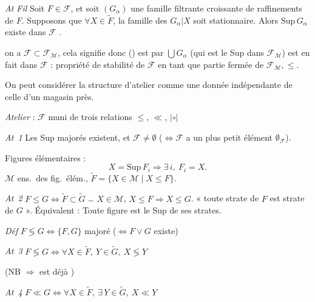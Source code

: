 \documentclass[11pt,a4paper]{article}
\begin{document}
\emph{At Fil}  Soit $F \in \mathcal{F}$, et soit $(G_\alpha)$ une famille filtrante croissante   de raffinements de $F$. Supposons que $\forall X \in \widetilde{F}$, la famille des $G_\alpha | X$ soit stationnaire. Alors $\mathrm{Sup}\, G_\alpha$ existe dans $\mathcal{F}$ \struck{\ill{}}.

 on a $\mathcal{F} \subset \mathcal{F}_{\mathcal{M}}$, cela signifie donc  \ill{} () est par $\bigcup G_\alpha$ (qui est le Sup dans $\mathcal{F}_{\mathcal{M}}$) est en fait dans $\mathcal{F}$ : propriété de stabilité de $\mathcal{F}$ en tant que partie \struck{\ill{}} fermée de $\mathcal{F}_{\mathcal{M}}, \leq$.

On peut considérer la structure d'atelier comme une donnée indépendante \ill{} de celle d'un magasin \ill{} \ill{} près.

\emph{Atelier} : $\mathcal{F}$ muni de trois relations $\leq$, $\ll$, $|\circ|$ \ill{}

\emph{At~1} Les Sup majorés existent, et $\mathcal{F} \neq \emptyset$ ($\Leftrightarrow \mathcal{F}$ a un plus petit élément $\emptyset_{\mathcal{F}}$).

 Figures élémentaires  :
\[
  X = \mathrm{Sup}\, F_i \Longrightarrow \exists\, i,\ F_i = X .
\]
\struck{\ill{}} $\mathcal{M}$ ens.\ des fig.\ élém., $\widetilde{F} = \{ X \in \mathcal{M} \mid X \leq F \}$.

\emph{At~2} $F \leq G \Longleftrightarrow \widetilde{F} \subset \widetilde{G}$ \struck{\ill{}} … $X \in \mathcal{M}$, $X \leq F \Rightarrow X \leq G$.
« toute strate de $F$ est strate de $G$ ».
Équivalent : Toute figure est le Sup de ses strates.


\emph{Déf} $F \lessgtr G \Longleftrightarrow \{F, G\}$ majoré ($\Longleftrightarrow F \vee G$ existe)

\emph{At~3} $F \lessgtr G \Longleftrightarrow \forall X \in \widetilde{F},\ Y \in \widetilde{G},\ X \lessgtr Y$

(NB $\Rightarrow$ est déjà \ill{})

\emph{At~4} $F \ll G \Longleftrightarrow \forall X \in \widetilde{F},\ \exists\, Y \in \widetilde{G},\ X \ll Y$

\end{document}
